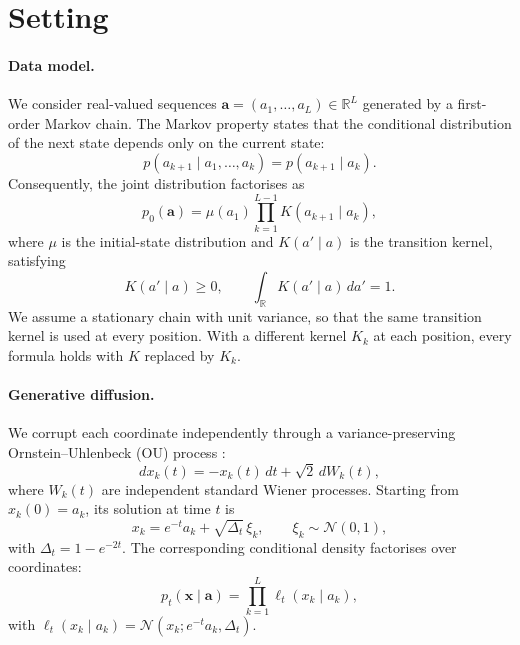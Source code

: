 \section{Setting}
\label{sec:setting}

\paragraph{Data model.}
We consider real-valued sequences
$\mathbf{a}=(a_1,\ldots,a_L)\in\mathbb{R}^L$
generated by a first-order Markov chain. The Markov property
states that the conditional distribution of the next state
depends only on the current state:
\begin{equation}
p(a_{k+1}\mid a_1,\ldots,a_k)
=
p(a_{k+1}\mid a_k).
\end{equation}
Consequently, the joint distribution factorises as
\begin{equation}
p_0(\mathbf{a})
=
\mu(a_1)
\prod_{k=1}^{L-1}
K(a_{k+1}\mid a_k),
\label{eq:markov_prior}
\end{equation}
where $\mu$ is the initial-state distribution and
$K(a'\mid a)$ is the transition kernel, satisfying
\begin{equation}
K(a'\mid a)\geq 0,
\qquad
\int_{\mathbb{R}} K(a'\mid a)\,da'=1.
\end{equation}
We assume a stationary chain with unit variance, so that
the same transition kernel is used at every position. With a different kernel $K_k$ at each
position, every formula holds with $K$ replaced by $K_k$.

\paragraph{Generative diffusion.}
We corrupt each coordinate independently through a
variance-preserving Ornstein--Uhlenbeck (OU) process
\cite{song2021scorebased}:
\begin{equation}
dx_k(t)=-x_k(t)\,dt+\sqrt{2}\,dW_k(t),
\end{equation}
where $W_k(t)$ are independent standard Wiener processes.
Starting from $x_k(0)=a_k$, its solution at time $t$ is
\begin{equation}
x_k=e^{-t}a_k+\sqrt{\Delta_t}\,\xi_k,
\qquad
\xi_k\sim\mathcal{N}(0,1),
\label{eq:ou_corruption}
\end{equation}
with $\Delta_t=1-e^{-2t}$.
The corresponding conditional density factorises over
coordinates:
\begin{equation}
p_t(\mathbf{x}\mid\mathbf{a})
=
\prod_{k=1}^{L}
\ell_t(x_k\mid a_k),
\label{eq:ou_likelihood}
\end{equation}
with $\ell_t(x_k\mid a_k)=\mathcal{N}(x_k;e^{-t}a_k,\Delta_t)$.

